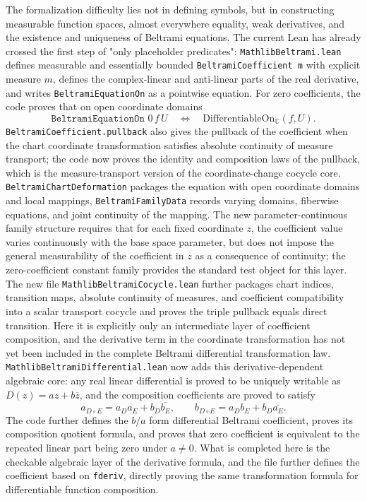 \documentclass[UTF8,a4paper,11pt]{article}
\begin{document}
The formalization difficulty lies not in defining symbols, but in constructing measurable function spaces, almost everywhere equality, weak derivatives, and the existence and uniqueness of Beltrami equations. The current Lean has already crossed the first step of "only placeholder predicates":
\texttt{MathlibBeltrami.lean} defines measurable and essentially bounded
\texttt{BeltramiCoefficient m} with explicit measure $m$, defines the complex-linear and anti-linear parts of the real derivative, and writes
\texttt{BeltramiEquationOn} as a pointwise equation. For zero coefficients, the code proves that on open coordinate domains
\[
\texttt{BeltramiEquationOn }0\,f\,U
\quad\Longleftrightarrow\quad
\mathrm{DifferentiableOn}_{\mathbb C}(f,U).
\]
\texttt{BeltramiCoefficient.pullback} also gives the pullback of the coefficient when the chart coordinate transformation satisfies absolute continuity of measure transport; the code now proves the identity and composition laws of the pullback, which is the measure-transport version of the coordinate-change cocycle core.
\texttt{BeltramiChartDeformation} packages the equation with open coordinate domains and local mappings,
\texttt{BeltramiFamilyData} records varying domains, fiberwise equations, and joint continuity of the mapping.
The new parameter-continuous family structure requires that for each fixed coordinate $z$, the coefficient value varies continuously with the base space parameter, but does not impose the general measurability of the coefficient in $z$ as a consequence of continuity; the zero-coefficient constant family provides the standard test object for this layer.
The new file \texttt{MathlibBeltramiCocycle}\allowbreak\texttt{.lean} further packages chart indices, transition maps, absolute continuity of measures, and coefficient compatibility into a scalar transport cocycle and proves the triple pullback equals direct transition.
Here it is explicitly only an intermediate layer of coefficient composition, and the derivative term in the coordinate transformation has not yet been included in the complete Beltrami differential transformation law.
\texttt{MathlibBeltramiDifferential}\allowbreak\texttt{.lean} now adds this derivative-dependent algebraic core:
any real linear differential is proved to be uniquely writable as
\(D(z)=a z+b\overline z\), and the composition coefficients are proved to satisfy
\[
  a_{D\circ E}=a_Da_E+b_D\overline{b_E},\qquad
  b_{D\circ E}=a_Db_E+b_D\overline{a_E}.
\]
The code further defines the \(b/a\) form differential Beltrami coefficient, proves its composition quotient formula, and proves that zero coefficient is equivalent to the repeated linear part being zero under \(a\ne0\). What is completed here is the checkable algebraic layer of the derivative formula, and the file further defines the coefficient based on \texttt{fderiv}, directly proving the same transformation formula for differentiable function composition.
\end{document}
